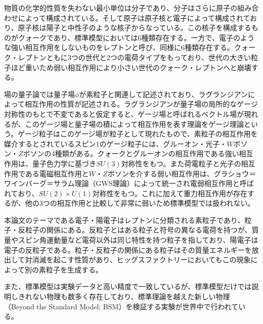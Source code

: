 物質の化学的性質を失わない最小単位は分子であり、分子はさらに原子の組み合わせによって構成されている。そして原子は原子核と電子によって構成されており、原子核は陽子と中性子のような核子からなっている。この核子を構成するものがクォークであり、標準模型においては6種類存在する。一方で、電子のような強い相互作用をしないものをレプトンと呼び、同様に6種類存在する。クォーク・レプトンともに3つの世代と2つの電荷タイプをもっており、世代の大きい粒子ほど重いため弱い相互作用により小さい世代のクォーク・レプトンへと崩壊する。

場の量子論では量子場$\phi$が素粒子と関連して記述されており、ラグランジアンによって相互作用の性質が記述される。ラグランジアンが量子場の局所的なゲージ対称性のもとで不変であると仮定すると、ゲージ場と呼ばれるベクトル場が現れるが、このゲージ場と量子場の積によって相互作用を表す理論をゲージ理論という。ゲージ粒子はこのゲージ場が粒子として現れたもので、素粒子の相互作用を媒介するとされているスピン1のゲージ粒子には、グルーオン・光子・$W$ボソン・$Z$ボソンの4種類がある。クォークとグルーオンの相互作用である強い相互作用は、量子色力学に基づき$SU(3)$対称性をもつ。また荷電粒子と光子の相互作用である電磁相互作用と$W$・$Z$ボソンを介する弱い相互作用は、グラショウ＝ワインバーグ＝サラム理論（GWS理論）\cite{gws}によって統一され電弱相互作用と呼ばれており、$SU(2)\times U(1)$対称性をもつ。これに加えて重力相互作用が存在するが、他の3つの相互作用と比較して非常に弱いため標準模型では扱われない。

本論文のテーマである電子・陽電子はレプトンに分類される素粒子であり、粒子・反粒子の関係にある。反粒子とはある粒子と符号の異なる電荷を持つが、質量やスピン角運動量など電荷以外は同じ特性を持つ粒子を指しており、陽電子は電子の反粒子である。粒子・反粒子の関係にある粒子はその質量エネルギーを放出して対消滅を起こす性質があり、ヒッグスファクトリーにおいてもこの現象によって別の素粒子を生成する。

また、標準模型は実験データと高い精度で一致しているが、標準模型だけでは説明しきれない物理も数多く存在しており、標準理論を越えた新しい物理（Beyond the Standard Model; BSM）を検証する実験が世界中で行われている。

